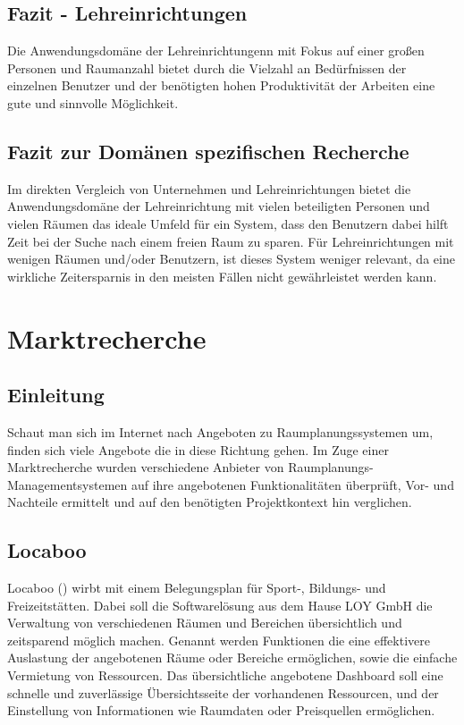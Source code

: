 \subsection{Fazit - Lehreinrichtungen}
\label{sec:Fazit - Lehreinrichtungen}

Die Anwendungsdomäne der Lehreinrichtungenn mit Fokus auf einer großen
Personen und Raumanzahl bietet durch die Vielzahl an Bedürfnissen der
einzelnen Benutzer und der benötigten hohen Produktivität der Arbeiten
eine gute und sinnvolle Möglichkeit.

\subsection{Fazit zur Domänen spezifischen Recherche}
\label{sec:Fazit zur Domänen spezifischen Recherche}

Im direkten Vergleich von Unternehmen und Lehreinrichtungen bietet die
Anwendungsdomäne der Lehreinrichtung mit vielen beteiligten Personen und vielen
Räumen das ideale Umfeld für ein System, dass den Benutzern dabei hilft Zeit
bei der Suche nach einem freien Raum zu sparen. Für Lehreinrichtungen mit
wenigen Räumen und/oder Benutzern, ist dieses System weniger relevant, da eine
wirkliche Zeitersparnis in den meisten Fällen nicht gewährleistet werden kann.


\section{Marktrecherche}
\label{sec:Marktrecherche}

\subsection{Einleitung}
\label{sec:Markt_recherheEinleitung}

Schaut man sich im Internet nach Angeboten zu Raumplanungssystemen um, finden
sich viele Angebote die in diese Richtung gehen. Im Zuge einer Marktrecherche
wurden verschiedene Anbieter von Raumplanungs-Managementsystemen auf ihre
angebotenen Funktionalitäten überprüft, Vor- und Nachteile ermittelt und auf
den benötigten Projektkontext hin verglichen.

\subsection{Locaboo}
\label{sec:Locaboo}

Locaboo (\citep{Locaboo}) wirbt mit einem Belegungsplan für Sport-,
Bildungs- und Freizeitstätten. Dabei soll die Softwarelösung aus dem 
Hause LOY GmbH die Verwaltung von verschiedenen Räumen und Bereichen
übersichtlich und zeitsparend möglich machen. Genannt werden Funktionen die
eine effektivere Auslastung der angebotenen Räume oder Bereiche ermöglichen,
sowie die einfache Vermietung von Ressourcen. Das übersichtliche angebotene
Dashboard soll eine schnelle und zuverlässige Übersichtsseite der vorhandenen
Ressourcen, und der Einstellung von Informationen wie Raumdaten oder
Preisquellen ermöglichen.

